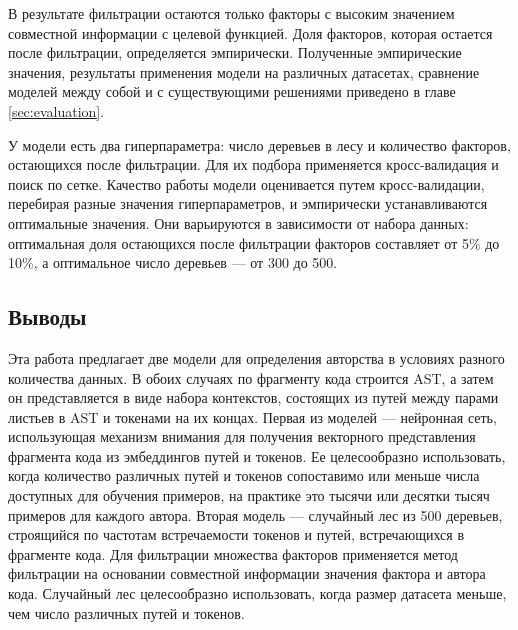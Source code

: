 В результате фильтрации остаются только факторы с высоким значением совместной информации с целевой функцией. Доля факторов, которая остается после фильтрации, определяется эмпирически. Полученные эмпирические значения, результаты применения модели на различных датасетах, сравнение моделей между собой и с существующими решениями приведено в главе \ref{sec:evaluation}.

У модели есть два гиперпараметра: число деревьев в лесу и количество факторов, остающихся после фильтрации. Для их подбора применяется кросс-валидация и поиск по сетке. Качество работы модели оценивается путем кросс-валидации, перебирая разные значения гиперпараметров, и эмпирически устанавливаются оптимальные значения. Они варьируются в зависимости от набора данных: оптимальная доля остающихся после фильтрации факторов составляет от 5\% до 10\%, а оптимальное число деревьев — от 300 до 500.

\subsection{Выводы}
Эта работа предлагает две модели для определения авторства в условиях разного количества данных. В обоих случаях по фрагменту кода строится AST, а затем он представляется в виде набора контекстов, состоящих из путей между парами листьев в AST и токенами на их концах. Первая из моделей — нейронная сеть, использующая механизм внимания для получения векторного представления фрагмента кода из эмбеддингов путей и токенов. Ее целесообразно использовать, когда количество различных путей и токенов сопоставимо или меньше числа доступных для обучения примеров, на практике это тысячи или десятки тысяч примеров для каждого автора. Вторая модель — случайный лес из 500 деревьев, строящийся по частотам встречаемости токенов и путей, встречающихся в фрагменте кода. Для фильтрации множества факторов применяется метод фильтрации на основании совместной информации значения фактора и автора кода. Случайный лес целесообразно использовать, когда размер датасета меньше, чем число различных путей и токенов.

